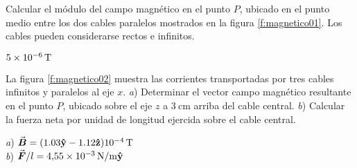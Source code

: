 \setcounter{figure}{0}

\begin{Exercise}\label{p:magnetico01}
    Calcular el módulo del campo magnético en el punto $P$, ubicado en el punto medio entre los dos cables paralelos mostrados en la figura \ref{f:magnetico01}. Los cables pueden considerarse rectos e infinitos.
\end{Exercise}
\begin{Answer}
    $\SI{5E-6}{\tesla}$
\end{Answer}
%
\begin{Exercise}\label{p:magnetico02}
    La figura \ref{f:magnetico02} muestra las corrientes transportadas por tres cables infinitos y paralelos al eje $x$. \textit{a}) Determinar el vector campo magnético resultante en el punto $P$, ubicado sobre el eje $z$ a $\SI{3}{\centi\metre}$ arriba del cable central. \textit{b}) Calcular la fuerza neta por unidad de longitud ejercida sobre el cable central.
\end{Exercise}
\begin{Answer}
    \begin{minipage}[t]{.4\textwidth}
        \textit{a}) $\va*{B} = (1.03\vu{y}-1.12\vu{z})\SI{E-4}{\tesla}$\\ \textit{b}) $\va*{F}/l = \SI{4.55E-3}{\newton/\metre}\vu{y}$
    \end{minipage}
\end{Answer}
%
\noindent
\begin{minipage}[c]{0.5\textwidth}
\begin{center}
\end{center}
\end{minipage}
